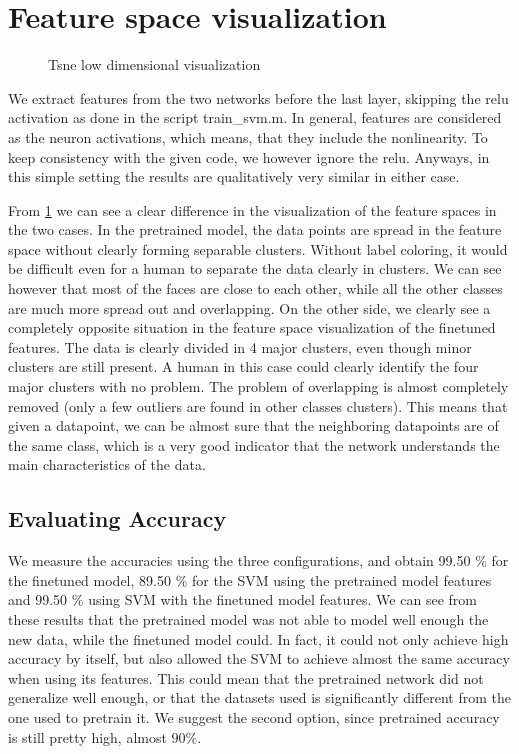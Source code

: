 \documentclass{article}
\begin{document}
\section{Feature space visualization}

\begin{figure}[h]
    \centering
    \caption{Tsne low dimensional visualization}
\label{fig:tsne}
\end{figure}

We extract features from the two networks before the last layer, skipping the relu activation as done in the script train\_svm.m. In general, features are considered as the neuron activations, which means, that they include the nonlinearity. To keep consistency with the given code, we however ignore the relu. Anyways, in this simple setting the results are qualitatively very similar in either case.

From \cref{fig:tsne} we can see a clear difference in the visualization of the feature spaces in the two cases. In the pretrained model, the data points are spread in the feature space without clearly forming separable clusters. Without label coloring, it would be difficult even for a human to separate the data clearly in clusters. We can see however that most of the faces are close to each other, while all the other classes are much more spread out and overlapping. On the other side, we clearly see a completely opposite situation in the feature space visualization of the finetuned features. The data is clearly divided in 4 major clusters, even though minor clusters are still present. A human in this case could clearly identify the four major clusters with no problem. The problem of overlapping is almost completely removed (only a few outliers are found in other classes clusters). This means that given a datapoint, we can be almost sure that the neighboring datapoints are of the same class, which is a very good indicator that the network understands the main characteristics of the data.

\subsection{Evaluating Accuracy}

We measure the accuracies using the three configurations, and obtain 99.50 $\%$ for the finetuned model, 89.50 $\%$ for the SVM using the pretrained model features and 99.50 $\%$ using SVM with the finetuned model features. We can see from these results that the pretrained model was not able to model well enough the new data, while the finetuned model could. In fact, it could not only achieve high accuracy by itself, but also allowed the SVM to achieve almost the same accuracy when using its features. This could mean that the pretrained network did not generalize well enough, or that the datasets used is significantly different from the one used to pretrain it. We suggest the second option, since pretrained accuracy is still pretty high, almost $90\%$.
\end{document}
